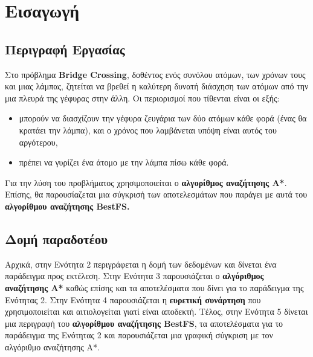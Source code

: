 \documentclass[12pt]{article}
\begin{document}
    
\section{Εισαγωγή}
\subsection{Περιγραφή Εργασίας}
Στο πρόβλημα \textbf{Bridge Crossing}, δοθέντος ενός συνόλου ατόμων, των χρόνων τους και μιας λάμπας, ζητείται να βρεθεί η καλύτερη δυνατή διάσχηση των ατόμων από την μια πλευρά της γέφυρας στην άλλη. Οι περιορισμοί που τίθενται είναι οι εξής:
\begin{itemize}
    \item μπορούν να διασχίζουν την γέφυρα ζευγάρια των δύο ατόμων κάθε φορά (ένας θα κρατάει την λάμπα), και ο χρόνος που λαμβάνεται υπόψη είναι αυτός του αργότερου,
    \item πρέπει να γυρίζει ένα άτομο με την λάμπα πίσω κάθε φορά.
\end{itemize}
Για την λύση του προβλήματος χρησιμοποιείται ο \textbf{αλγορίθμος αναζήτησης A*}. Eπίσης, θα παρουσίαζεται μια σύγκρισή των αποτελεσμάτων που παράγει με αυτά του \textbf{αλγορίθμου αναζήτησης BestFS.}
\subsection{Δομή παραδοτέου}
Αρχικά, στην Ενότητα 2 περιγράφεται η δομή των δεδομένων και δίνεται ένα παράδειγμα προς εκτέλεση. Στην Ενότητα 3 παρουσιάζεται ο \textbf{αλγόριθμος αναζήτησης A*} καθώς επίσης και τα αποτελέσματα που δίνει για το παράδειγμα της Ενότητας 2. Στην Ενότητα 4 παρουσιάζεται η \textbf{ευρετική συνάρτηση} που χρησιμοποιείται και αιτιολογείται γιατί είναι αποδεκτή. Τέλος, στην Ενότητα 5 δίνεται μια περιγραφή του \textbf{αλγορίθμου αναζήτησης BestFS}, τα αποτελέσματα για το παράδειγμα της Ενότητας 2 και παρουσιάζεται μια γραφική σύγκριση με τον αλγόριθμο αναζήτησης Α*.
\end{document}
